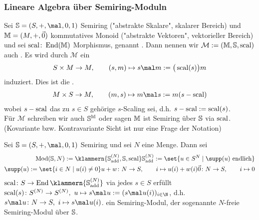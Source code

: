 \subsubsection{Lineare Algebra über Semiring-Moduln}
Sei $\S=(S,+,\mal,0,1)$ Semiring ("abstrakte Skalare", skalarer Bereich) und $\M=(M,+,\vec{0})$ kommutatives Monoid ("abstrakte Vektoren", vektorieller Bereich) und sei $\scal\colon\End(\M)$ Morphismus, genannt .
Dann nennen wir $\mathcal{M}:=(\M,\S,\scal)$ auch .
Es wird durch $\mathcal{M}$ ein 
\begin{align*}
	S\times M\to M,\qquad (s,m)\mapsto s\mal m:=\big(\scal(s)\big) m
\end{align*}
induziert. Dies ist die .\\
\begin{align*}
	M\times S\to M,\qquad (m,s)\mapsto m\mal s:=m(s-\scal)
\end{align*}
wobei $s-\scal$ das zu $s\in S$ gehörige $s$-Scaling sei, d.h. $s-\scal:=\scal(s)$.\\
Für $\mathcal{M}$ schreiben wir auch $\S^\M$ oder sagen $\M$ ist Semiring über $\S$ via $\scal$.\\
(Kovariante bzw. Kontravariante Sicht ist nur eine Frage der Notation)

\begin{beispiel}\enter
	Sei $\S=(S,+,\mal,0,1)$ Semiring und sei $N$ eine Menge.
	Dann sei
	\begin{align*}
		\Mod(\S,N):=\klammern{\S_{\add}^{(N)},\S,\scal}
		\mit
		\S_{\add}^{(N)}:=\set{u\in S^N\mid\supp(u)\text{ endlich}}
		\mit\\
		\supp(u):=\set{i\in N\mid u(i)\neq 0}
		u+w\colon N\to S,\qquad i\mapsto u(i)+w(i)
		\vec{0}\colon N\to S,\qquad i\mapsto 0
	\end{align*}
	$\scal\colon S\to\End\klammern{\S_{\add}^{(N)}}$ via jedes $s\in S$ erfüllt $\scal(s)\colon S^{(N)}\to S^{(N)},~u\mapsto s\mal u:=(s\mal u(i))_{i\in\N}$, d.h. $s\mal u\colon N\to S,~i\mapsto s\mal u(i)$.
	ein Semiring-Modul, der sogenannte $N$-freie Semiring-Modul über $\S$.
\end{beispiel}


